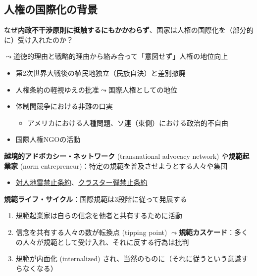 \documentclass[
  xelatex,
  ja=standard]{bxjsarticle}
\providecommand{\tightlist}{%
  \setlength{\itemsep}{0pt}\setlength{\parskip}{0pt}}\usepackage{longtable,booktabs,array}
\begin{document}
\hypertarget{ux4ebaux6a29ux306eux56fdux969bux5316ux306eux80ccux666f}{%
\subsection{人権の国際化の背景}\label{ux4ebaux6a29ux306eux56fdux969bux5316ux306eux80ccux666f}}

なぜ\textbf{内政不干渉原則に抵触するにもかかわらず}、国家は人権の国際化を（部分的に）受け入れたのか？

\(\leadsto\)道徳的理由と戦略的理由から絡み合って「意図せず」人権の地位向上\citep[第2章]{tsutsui2022}

\begin{itemize}
\tightlist
\item
  第2次世界大戦後の植民地独立（民族自決）と差別撤廃
\item
  人権条約の軽視ゆえの批准\(\leadsto\)国際人権としての地位\citep{hafner2005b}
\item
  体制間競争における非難の口実

  \begin{itemize}
  \tightlist
  \item
    アメリカにおける人種問題、ソ連（東側）における政治的不自由
  \end{itemize}
\item
  国際人権NGOの活動\citep{tsutsui2004}
\end{itemize}

\textbf{越境的アドボカシー・ネットワーク} (transnational advocacy
network) や\textbf{規範起業家} (norm
entrepreneur)：特定の規範を普及させようとする人々や集団

\begin{itemize}
\tightlist
\item
  \href{https://www.mofa.go.jp/mofaj/gaiko/arms/mine/genjo.html}{対人地雷禁止条約}、\href{https://www.mofa.go.jp/mofaj/gaiko/treaty/shomei_37.html}{クラスター弾禁止条約}
\end{itemize}

\textbf{規範ライフ・サイクル}：国際規範は3段階に従って発展する\citep{finnemore1998}

\begin{enumerate}
\def\labelenumi{\arabic{enumi}.}
\tightlist
\item
  規範起業家は自らの信念を他者と共有するために活動
\item
  信念を共有する人々の数が転換点 (tipping point)
  \(\leadsto\)\textbf{規範カスケード}：多くの人々が規範として受け入れ、それに反する行為は批判
\item
  規範が内面化 (internalized)
  され、当然のものに（それに従うという意識すらなくなる）
\end{enumerate}
\end{document}
